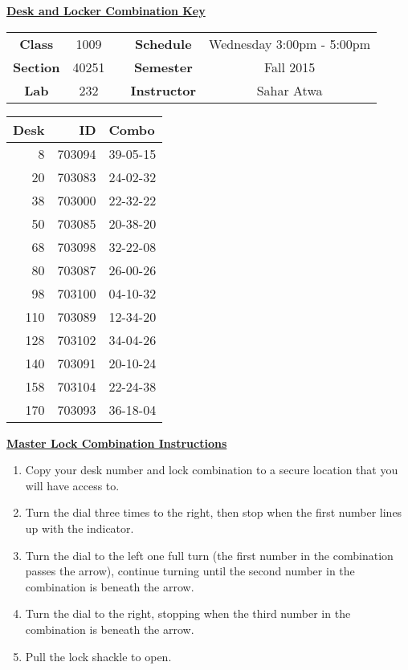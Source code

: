 \documentclass[12pt]{article}
\begin{document}
\thispagestyle{empty}

\begin{center}
	{\huge\textbf{\underline{ Desk and Locker Combination Key}}}
\end{center}


\begin{table}[h]
  \centering
  \begin{tabular}{ccccc}

  \textbf{Class} & 1009 & {\qquad} &\textbf{Schedule} & Wednesday 3:00pm - 5:00pm \\
  \textbf{Section} & 40251 & {\qquad} & \textbf{Semester} & Fall 2015 \\
  \textbf{Lab} & 232 & {\qquad} & \textbf{Instructor} & Sahar Atwa \\
  \end{tabular}
\end{table}
 \vspace{0.5in}
\begin{minipage}{0.4\textwidth}

\begin{tabular}{rrl}
\toprule
 Desk &      ID &     Combo \\
\midrule
    8 &  703094 &  39-05-15 \\
   20 &  703083 &  24-02-32 \\
   38 &  703000 &  22-32-22 \\
   50 &  703085 &  20-38-20 \\
   68 &  703098 &  32-22-08 \\
   80 &  703087 &  26-00-26 \\
   98 &  703100 &  04-10-32 \\
  110 &  703089 &  12-34-20 \\
  128 &  703102 &  34-04-26 \\
  140 &  703091 &  20-10-24 \\
  158 &  703104 &  22-24-38 \\
  170 &  703093 &  36-18-04 \\
\bottomrule
\end{tabular}


\end{minipage}
\begin{minipage}{0.4\textwidth}
\underline{{\large \textbf{Master Lock Combination Instructions}}}
\begin{enumerate}
\item Copy your desk number and lock combination to a secure location that you will have access to.
\item Turn the dial three times to the right, then stop when the first number lines up with the indicator.
\item Turn the dial to the left one full turn (the first number in the combination passes the arrow), continue turning until the second number in the combination is beneath the arrow.
\item Turn the dial to the right, stopping when the third number in the combination is beneath the arrow.
\item Pull the lock shackle to open.
\end{enumerate}
\end{minipage}
\end{document}
